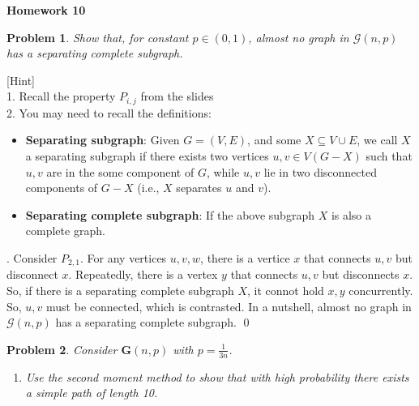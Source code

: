 \documentclass[12pt]{article}
\date{Feb 14, 2012}
\newtheorem{hw}{Problem}
\newenvironment{sol}
  {\par\vspace{3mm}\noindent{\it Solution}.}
  {\qed}
\begin{document}
\begin{center}
{\LARGE\bf Homework 10}\\
\vspace{2mm}
\end{center}

\begin{hw}
Show that, for constant $p\in(0,1)$, almost no graph in $\mathcal{G}(n,p)$ has a separating complete subgraph.
\end{hw}
[Hint] \\
1. Recall the property $P_{i,j}$ from the slides\\
2.
You may need to recall the definitions:
\begin{itemize}
  \item \textbf{Separating subgraph}: Given $G=(V,E)$, and some $X\subseteq V\cup E$, we call $X$ a separating subgraph if there exists two vertices  $u,v \in V(G-X)$  such that $u,v$ are in the some component of $G$, while $u,v$ lie in two disconnected components of $G-X$ (i.e., $X$ separates $u$ and $v$).
  \item \textbf{Separating complete subgraph}: If the above subgraph $X$ is also a complete graph.
\end{itemize}

\begin{sol}
    Consider $P_{2,1}$. For any vertices $u,v,w$, there is a vertice $x$ that connects $u,v$ but disconnect $x$. Repeatedly, there is a vertex $y$ that connects $u,v$ but disconnects $x$.
    So, if there is a separating complete subgraph $X$, it connot hold $x,y$ concurrently. So, $u,v$ must be connected, which is contrasted. In a nutshell, almost no graph in $\mathcal{G}(n,p)$ has a separating complete subgraph.
\end{sol}

\begin{hw}
Consider $\mathbf{G}(n,p)$ with $p=\frac{1}{3n}$.
\begin{enumerate}[]
  \item Use the second moment method to show that with high probability there exists a simple path of length 10.
\end{enumerate}
\end{hw}
\end{document}
